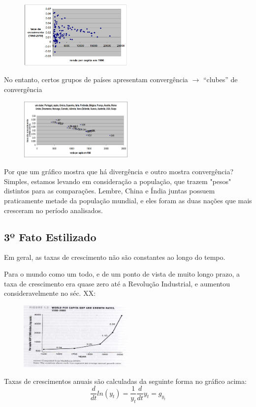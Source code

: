 \documentclass[a4paper,12pt]{article}[abntex2]
\begin{document}
\begin{figure}[H]
        \centering
        \includegraphics[width=0.5\textwidth]{Imagens/a1i9.png}
\end{figure}

No entanto, certos grupos de países apresentam convergência  $\rightarrow$ “clubes” de convergência

\begin{figure}[H]
        \centering
        \includegraphics[width=0.5\textwidth]{Imagens/a1i10.png}
\end{figure}

Por que um gráfico mostra que há divergência e outro mostra convergência? Simples, estamos levando em consideração a população, que trazem "pesos" distintos para as comparações. Lembre, China e Índia juntas possuem praticamente metade da população mundial, e eles foram as duas nações que mais cresceram no período analisados. 

\subsection{\textbf{3º Fato Estilizado}}
Em geral, as taxas de crescimento não são constantes ao longo do tempo.

Para o mundo como um todo, e de um ponto de vista de muito longo prazo, a taxa de crescimento era quase zero até a Revolução Industrial, e aumentou consideravelmente no séc. XX:

\begin{figure}[H]
        \centering
        \includegraphics[width=0.5\textwidth]{Imagens/a1i11.png}
\end{figure}
Taxas de crescimentos anuais são calculadas da seguinte forma no gráfico acima:
$$\frac{d}{dt}ln(y_t)=\frac{1}{y_t}\frac{d}{dt}y_t=g_{y_t}$$
\end{document}
